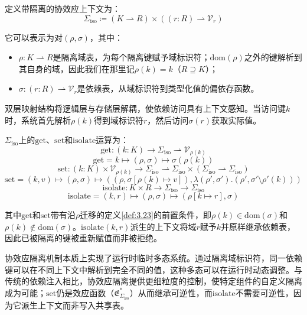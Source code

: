 \begin{definition}\label{def:3.28}
定义带隔离的协效应上下文为：
\begin{equation}\label{eq:3.27}
\Sigma_{\mathrm{iso}} \coloneqq (K \rightharpoonup R) \times ((r: R) \rightharpoonup \mathcal{V}_r)
\end{equation}
\end{definition}

它可以表示为对$(\rho, \sigma)$，其中：
\begin{itemize}
\item $\rho: K \rightharpoonup R$是隔离域表，为每个隔离键赋予域标识符；$\mathrm{dom}(\rho)$之外的键解析到其自身的域，因此我们在那里记$\rho(k) = k$（$R \supseteq K$）；
\item $\sigma: (r: R) \rightharpoonup \mathcal{V}_r$是依赖表，从域标识符到类型化值的偏依存函数。
\end{itemize}

双层映射结构将逻辑层与存储层解耦，使依赖访问具有上下文感知。当访问键$k$时，系统首先解析$\rho(k)$得到域标识符$r$，然后访问$\sigma(r)$获取实际值。

\begin{definition}\label{def:3.29}
$\Sigma_{\mathrm{iso}}$上的$\mathrm{get}$、$\mathrm{set}$和$\mathrm{isolate}$运算为：
\begin{equation}\label{eq:3.28}
\mathrm{get} : (k: K) \to \Sigma_{\mathrm{iso}} \rightharpoonup \mathcal{V}_{\rho(k)}
\end{equation}
\[
\mathrm{get} = k \mapsto (\rho, \sigma) \mapsto \sigma(\rho(k))
\]
\[
\mathrm{set} : (k: K) \times \mathcal{V}_{\rho(k)} \to \Sigma_{\mathrm{iso}} \rightharpoonup \Sigma_{\mathrm{iso}} \times (\Sigma_{\mathrm{iso}} \rightharpoonup \Sigma_{\mathrm{iso}})
\]
\[
\mathrm{set} = (k, v) \mapsto (\rho, \sigma) \mapsto ((\rho, \sigma[\rho(k) \mapsto v]), \lambda(\rho', \sigma').(\rho', \sigma' \setminus \rho'(k)))
\]
\[
\mathrm{isolate} : K \times R \to \Sigma_{\mathrm{iso}} \to \Sigma_{\mathrm{iso}}
\]
\[
\mathrm{isolate} = (k, r) \mapsto (\rho, \sigma) \mapsto (\rho[k \mapsto r], \sigma)
\]
\end{definition}

其中$\mathrm{get}$和$\mathrm{set}$带有沿$\rho$迁移的定义\ref{def:3.23}的前置条件，即$\rho(k) \in \mathrm{dom}(\sigma)$和$\rho(k) \notin \mathrm{dom}(\sigma)$。$\mathrm{isolate}(k, r)$派生的上下文将域$r$赋予$k$并原样继承依赖表，因此已被隔离的键被重新赋值而非被拒绝。

协效应隔离机制本质上实现了运行时临时多态系统。通过隔离域标识符，同一依赖键可以在不同上下文中解析到完全不同的值，这种多态可以在运行时动态调整。与传统的依赖注入相比，协效应隔离提供更细粒度的控制，使特定组件的自定义隔离成为可能；$\mathrm{set}$仍是效应函数（$\mathfrak{E}^*_{\Sigma_{\mathrm{iso}}}$）从而继承可逆性，而$\mathrm{isolate}$不需要可逆性，因为它派生上下文而非写入共享表。

